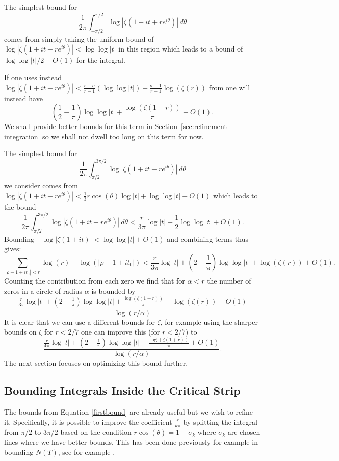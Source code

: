 \documentclass[10pt,english,letter, reqno]{amsart}
\theoremstyle{plain}
\theoremstyle{definition}
\begin{document}
The simplest bound for
\[  \frac{1}{2\pi}\int_{-\pi/2}^{\pi/2} \log|\zeta(1+it+re^{i\theta})|\,d\theta  \]
comes from simply taking the uniform bound of $\log|\zeta(1+it+re^{i\theta})| < \log\log|t|$ in this region which leads to a bound of $\log\log|t|/2 + O(1)$ for the integral.

If one uses instead  $\log|\zeta(1+it+re^{i\theta})| < \frac{r-\sigma}{r-1}(\log\log|t|) + \frac{\sigma-1}{r-1}\log(\zeta(r))$ from \cite[Section~4.1]{Fiori2026} one will instead have
\[ \left(\frac{1}{2}-\frac{1}{\pi}\right) \log\log|t| + \frac{\log(\zeta(1+r))}{\pi}  + O(1). \]
We shall provide better bounds for this term in Section~\ref{sec:refinement-integration} so we shall not dwell too long on this term for now.

The simplest bound for
\[  \frac{1}{2\pi}\int_{\pi/2}^{3\pi/2} \log|\zeta(1+it+re^{i\theta})|\,d\theta  \]
we consider comes from $\log|\zeta(1+it+re^{i\theta})|  < \frac{1}{3}r\cos(\theta)\log|t| + \log\log|t| + O(1)$
which leads to the bound
\[  \frac{1}{2\pi}\int_{\pi/2}^{3\pi/2} \log|\zeta(1+it+re^{i\theta})|\,d\theta < \frac{r}{3\pi}\log|t| + \frac{1}{2}\log\log|t| + O(1). \]
Bounding $-\log|\zeta(1+it)| < \log\log|t| + O(1)$ and combining terms thus gives:
\[  \sum_{|\rho - 1+it_0| < r}  \log(r) - \log(|\rho - 1+it_0|)  < \frac{r}{3\pi}\log|t| + (2-\frac{1}{\pi})\log\log|t| + \log(\zeta(r)) + O(1). \]
Counting the contribution from each zero we find that for $\alpha<r$ the number of zeros in a circle of radius $\alpha$ is bounded by
\begin{equation}\label{firstbound} \frac{\frac{r}{3\pi}\log|t| + (2-\frac{1}{\pi})\log\log|t| + \frac{\log(\zeta(1+r))}{\pi}  +\log(\zeta(r)) + O(1)}{\log(r/\alpha) } \end{equation}
It is clear that we can use a different bounds for $\zeta$, for example using the sharper bounds on $\zeta$ for $r<2/7$ one can improve this (for $r<2/7$) to 
\begin{equation}\label{shorterbound} \frac{\frac{r}{4\pi}\log|t| + (2-\frac{1}{\pi})\log\log|t|  +\frac{\log(\zeta(1+r))}{\pi}  +O(1)}{\log(r/\alpha)}. \end{equation}
The next section focuses on optimizing this bound further.

\subsection{Bounding Integrals Inside the Critical Strip}\label{sec:inside}

The bounds from Equation \eqref{firstbound} are already useful but we wish to refine it. Specifically, it is possible to improve the coefficient $\frac{r}{k\pi}$ by splitting the integral from $\pi/2$ to $3\pi/2$ based on the condition $r\cos(\theta)=1-\sigma_k$ where $\sigma_k$ are chosen lines where we have better bounds. This has been done previously for example in bounding $N(T)$, see for example \cite{BellottiWongFiori2025}.
\end{document}
